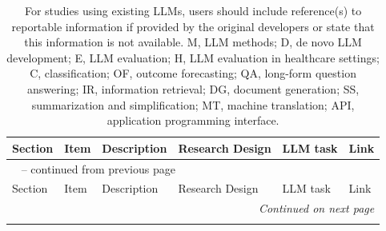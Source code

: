 \documentclass{article}
\begin{document}
\begin{longtable}{p{} l p{} l p{} l }
    \caption{For studies using existing LLMs, users should include reference(s) to reportable information if provided by the original developers or state that this information is not available. M, LLM methods; D, de novo LLM development; E, LLM evaluation; H, LLM evaluation in healthcare settings; C, classification; OF, outcome forecasting; QA, long-form question answering; IR, information retrieval; DG, document generation; SS, summarization and simplification; MT, machine translation; API, application programming interface.}
    \label{tab:TRIPOD-LLM} \\
    \toprule
    Section & Item & Description & Research Design & LLM task & Link \\
    \midrule
    \endfirsthead

    \multicolumn{6}{l}{\tablename~\thetable{} -- continued from previous page}\\
    \toprule
    Section & Item & Description & Research Design & LLM task & Link \\
    \midrule
    \endhead

    \midrule
    \multicolumn{6}{r}{\emph{Continued on next page}}\\
    \endfoot

    \bottomrule
    \endlastfoot



\end{longtable}
\end{document}
